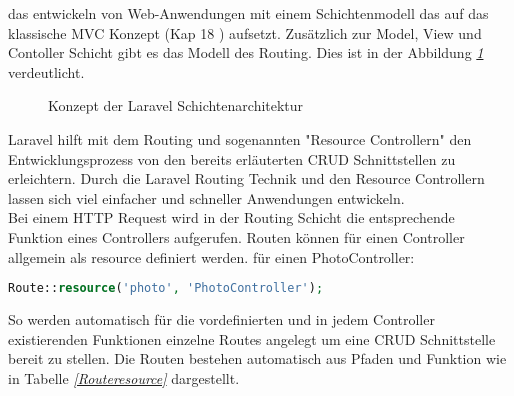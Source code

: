 das entwickeln von Web-Anwendungen mit einem Schichtenmodell das auf das klassische MVC Konzept (Kap 18 \cite{Methoden und Architekturen der Softwaretechnik}) aufsetzt. Zusätzlich zur Model, View und Contoller Schicht gibt es das Modell des Routing. Dies ist in der Abbildung \textit{\ref{LaravelLayer} } verdeutlicht.
\begin{figure}[!htb]
\centering
{}
\caption[Konzept der Laravel Schichtenarchitektur (erweitertes MVC)]{Konzept der Laravel Schichtenarchitektur}
\label{LaravelLayer}
\end{figure} Laravel hilft mit dem Routing und sogenannten "Resource Controllern" den Entwicklungsprozess von den bereits erläuterten CRUD Schnittstellen zu erleichtern. Durch die Laravel Routing Technik und den Resource Controllern lassen sich viel einfacher und schneller Anwendungen entwickeln.
\\Bei einem HTTP Request wird in der Routing Schicht die entsprechende Funktion eines Controllers aufgerufen. Routen können für einen Controller allgemein als resource definiert werden. \zB für einen PhotoController:
\begin{lstlisting}[language=php]
Route::resource('photo', 'PhotoController');
\end{lstlisting}
So werden automatisch für die vordefinierten und in jedem Controller existierenden Funktionen einzelne Routes angelegt um eine CRUD Schnittstelle bereit zu stellen.
Die Routen bestehen automatisch aus Pfaden und Funktion wie in Tabelle \textit{\ref{Routeresource} } dargestellt.

